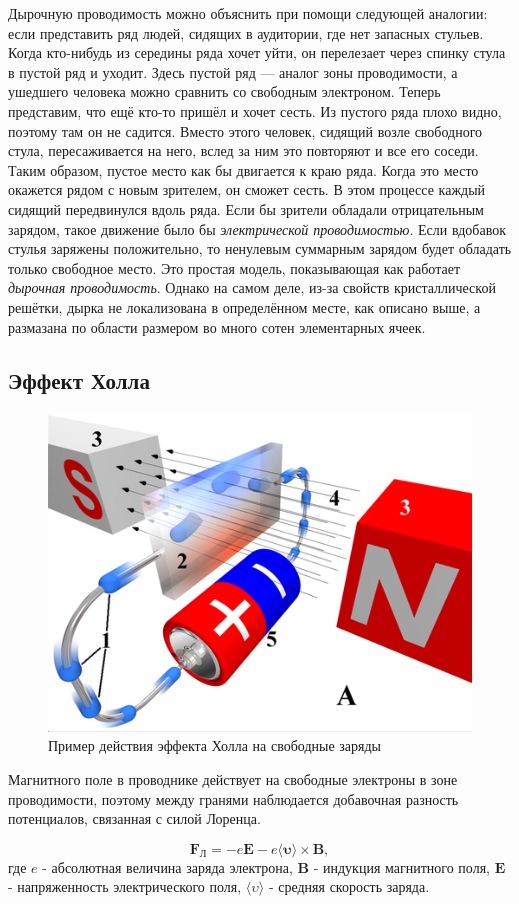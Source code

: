 \documentclass[a4paper, 12pt, twoside]{article}
\begin{document}
Дырочную проводимость можно объяснить при помощи следующей аналогии: если представить ряд людей, сидящих в аудитории, где нет запасных стульев. Когда кто-нибудь из середины ряда хочет уйти, он      перелезает через спинку стула в пустой ряд и уходит. Здесь пустой ряд — аналог зоны проводимости, а ушедшего человека можно сравнить со свободным электроном.
Теперь представим, что ещё кто-то пришёл и хочет сесть. Из пустого ряда плохо видно, поэтому там он не садится. Вместо этого человек, сидящий возле свободного стула, пересаживается на него, вслед за ним это повторяют и все его соседи. Таким образом, пустое место как бы двигается к краю ряда. Когда это место окажется рядом с новым зрителем, он сможет сесть.
В этом процессе каждый сидящий передвинулся вдоль ряда. Если бы зрители обладали отрицательным зарядом, такое движение было бы  \textit{электрической проводимостью}. Если вдобавок стулья заряжены положительно, то ненулевым суммарным зарядом будет обладать только свободное место. Это простая модель, показывающая как работает \textit{дырочная проводимость}. Однако на самом деле, из-за свойств кристаллической решётки, дырка не локализована в определённом месте, как описано выше, а размазана по области размером во много сотен элементарных ячеек.

\subsection{Эффект Холла}


\begin {figure}[H]
\begin{center}
	\includegraphics[width = 0.4 \textwidth]{Hall_effect}
	\caption{Пример действия эффекта Холла на свободные заряды}
\end{center}
\end {figure}


Магнитного поле в проводнике действует на свободные электроны в зоне проводимости, поэтому между гранями наблюдается добавочная разность потенциалов, связанная с силой Лоренца. 

$$\boldsymbol{F_\text{Л}}  = -e \boldsymbol{E} - e \langle \boldsymbol{\upsilon} \rangle \times \boldsymbol{B},$$
где $e$ - абсолютная величина заряда электрона, $\boldsymbol{B}$ - индукция магнитного поля, $\boldsymbol{E}$ - напряженность электрического поля, $ \langle \upsilon \rangle$ - средняя скорость заряда.
\end{document}
